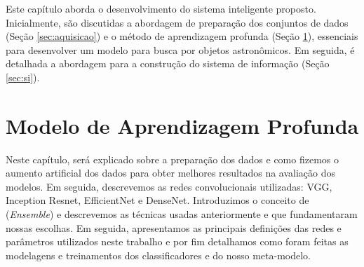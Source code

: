 








Este capítulo aborda o desenvolvimento do sistema inteligente proposto.  Inicialmente, são  discutidas a abordagem de preparação dos conjuntos de dados (Seção \ref{sec:aquisicao}) e o método de aprendizagem profunda (Seção \ref{sec:modelo}), essenciais para desenvolver um modelo para busca por objetos astronômicos. Em seguida, é detalhada a abordagem para a construção do sistema de informação (Seção \ref{sec:si}).







\section{Modelo de Aprendizagem Profunda}
\label{sec:modelo}

Neste capítulo, será explicado sobre a preparação dos dados e como fizemos o aumento artificial dos dados para obter melhores resultados na avaliação dos modelos. Em seguida, descrevemos as redes convolucionais utilizadas: VGG, Inception Resnet, EfficientNet e DenseNet. Introduzimos o conceito de (\emph{Ensemble}) e descrevemos as técnicas usadas anteriormente e que fundamentaram nossas escolhas. Em seguida, apresentamos as principais definições das redes e parâmetros utilizados neste trabalho e por fim detalhamos como foram feitas as modelagens e treinamentos dos classificadores e do nosso meta-modelo.


